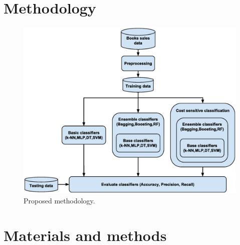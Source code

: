 \documentclass[a4paper,10pt,onecolumn,preprint,3p]{elsarticle}
\begin{document}
\section{Methodology}
\label{sec:methodology}

\begin{figure}[ht]
\begin{center}
\includegraphics[scale=0.40]{books_methodology}
\end{center}
\caption{Proposed methodology.}
\label{fig:methodology}
\end{figure}

\section{Materials and methods}
\label{sec:materials}

\end{document}
